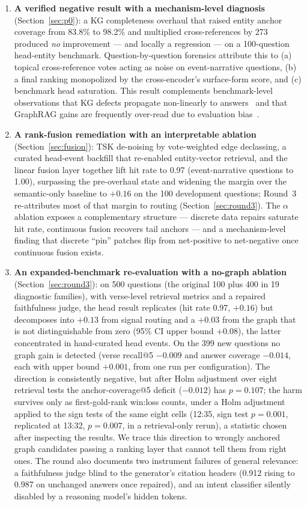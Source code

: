 \begin{enumerate}
\item \textbf{A verified negative result with a mechanism-level diagnosis}
(Section~\ref{sec:p0}): a KG completeness overhaul that raised entity
anchor coverage from 83.8\% to 98.2\% and multiplied cross-references by
273 produced \emph{no} improvement --- and locally a regression --- on a
100-question head-entity benchmark. Question-by-question forensics
attribute this to (a) topical cross-reference votes acting as noise on
event-narrative questions, (b) a final ranking monopolized by the
cross-encoder's surface-form score, and (c) benchmark head saturation. This
result complements benchmark-level observations that KG defects propagate
non-linearly to answers~\cite{zhou2025brink} and that GraphRAG gains are
frequently over-read due to evaluation bias~\cite{zeng2025unbiased}.

\item \textbf{A rank-fusion remediation with an interpretable ablation}
(Section~\ref{sec:fusion}): TSK de-noising by vote-weighted edge
declassing, a curated head-event backfill that re-enabled entity-vector
retrieval, and the linear fusion layer together lift hit rate to 0.97
(event-narrative questions to 1.00), surpassing the pre-overhaul state and
widening the margin over the semantic-only baseline to $+0.16$ on the 100
development questions; Round~3 re-attributes most of that margin to
routing (Section~\ref{sec:round3}). The
$\alpha$ ablation exposes a complementary structure --- discrete data
repairs saturate hit rate, continuous fusion recovers tail anchors --- and
a mechanism-level finding that discrete ``pin'' patches flip from
net-positive to net-negative once continuous fusion exists.

\item \textbf{An expanded-benchmark re-evaluation with a no-graph
ablation} (Section~\ref{sec:round3}): on 500 questions (the original 100
plus 400 in 19 diagnostic families), with verse-level retrieval metrics
and a repaired faithfulness judge, the head result replicates (hit rate
0.97, $+0.16$) but decomposes into $+0.13$ from signal routing and a
$+0.03$ from the graph that is not distinguishable from zero (95\% CI
upper bound $+0.08$), the latter concentrated in hand-curated head events. On the 399 new questions
no graph gain is detected (verse recall@5 $-0.009$ and answer coverage
$-0.014$, each with upper bound $+0.001$, from one run per
configuration). The direction is consistently negative, but after Holm
adjustment over eight retrieval tests the anchor-coverage@5 deficit
($-0.012$) has $p=0.107$; the harm survives only as first-gold-rank win:loss counts, under a Holm adjustment applied to the sign tests of the same eight cells (12:35, sign test $p=0.001$, replicated
at 13:32, $p=0.007$, in a retrieval-only rerun), a statistic chosen after
inspecting the results. We trace this direction to wrongly anchored
graph candidates passing a ranking layer that cannot tell them from right
ones. The round also
documents two instrument failures of general relevance: a faithfulness
judge blind to the generator's citation headers (0.912 rising to 0.987
on unchanged answers once repaired), and an intent classifier silently
disabled by a reasoning model's hidden tokens.


\end{enumerate}
